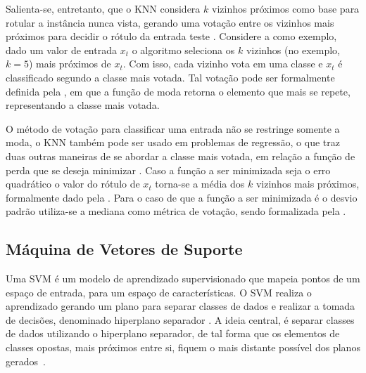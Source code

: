 Salienta-se, entretanto, que o \acrshort{KNN} considera $k$ vizinhos próximos como base para rotular a instância nunca vista, gerando uma votação entre os vizinhos mais próximos para decidir o rótulo da entrada teste \cite{faceli2011inteligencia}. Considere a  como exemplo, dado um valor de entrada $x_t$ o algoritmo seleciona os $k$ vizinhos (no exemplo, $k=5$)  mais próximos de $x_t$. Com isso, cada vizinho vota em uma classe e $x_t$ é classificado segundo a classe mais votada. Tal votação pode ser formalmente definida pela , em que a função de moda retorna o elemento que mais se repete, representando a classe mais votada.

%

O método de votação para classificar uma entrada não se restringe somente a moda, o \acrshort{KNN} também pode ser usado em problemas de regressão, o que traz duas outras maneiras de se abordar a classe mais votada, em relação a função de perda que se deseja minimizar \cite{faceli2011inteligencia}. Caso a função a ser minimizada seja o erro quadrático o valor do rótulo de $x_t$ torna-se a média dos $k$ vizinhos mais próximos, formalmente dado pela  \cite{larose2014discovering}. Para o caso de que a função a ser minimizada é o desvio padrão utiliza-se a mediana como métrica de votação, sendo formalizada pela .


\subsection{Máquina de Vetores de Suporte}
\label{sec:svm}

Uma \acrfull{SVM} \cite{boser1992training} é um modelo de aprendizado supervisionado que mapeia pontos de um espaço de entrada, para um espaço de características. O \acrshort{SVM} realiza o aprendizado gerando um plano para separar classes de dados e realizar a tomada de decisões, denominado hiperplano separador \cite{scholkopf2001learning}. A ideia central, é separar classes de dados utilizando o hiperplano separador, de tal forma que os elementos de classes opostas, mais próximos entre si, fiquem o mais distante possível dos planos gerados~\cite{hamel2011knowledge}.

